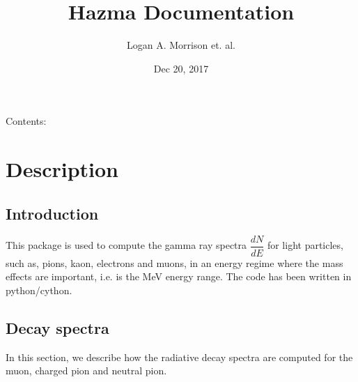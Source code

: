 \documentclass[letterpaper,10pt,english]{sphinxmanual}
\title{Hazma Documentation}
\date{Dec 20, 2017}
\author{Logan A. Morrison et. al.}
\begin{document}
\maketitle
\sphinxtableofcontents
{}\label{\detokenize{index::doc}}


Contents:


\chapter{Description}
\label{\detokenize{description::doc}}\label{\detokenize{description:description}}\label{\detokenize{description:welcome-to-hazma-s-documentation}}

\section{Introduction}
\label{\detokenize{description:introduction}}
This package is used to compute the gamma ray spectra \(\dfrac{dN}{dE}\) for light particles, such as, pions, kaon, electrons and muons, in an energy regime where the mass effects are important, i.e. is the MeV energy range. The code has been written in python/cython.


\section{Decay spectra}
\label{\detokenize{description:decay-spectra}}
In this section, we describe how the radiative decay spectra are computed for the muon, charged pion and neutral pion.
\end{document}
